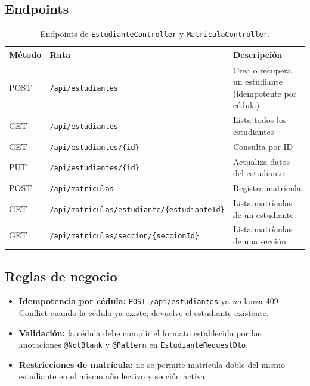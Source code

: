 \documentclass[11pt,a4paper,oneside]{article}
\newcommand{\code}[1]{\texttt{\small #1}}
\begin{document}
\subsection{Endpoints}

\begin{table}[h]
\centering\renewcommand{\arraystretch}{1.15}\small
\begin{tabular}{@{}p{1.4cm} p{6.0cm} p{6.5cm}@{}}
\toprule
\textbf{Método} & \textbf{Ruta} & \textbf{Descripción} \\
\midrule
POST & \code{/api/estudiantes}                                  & Crea o recupera un estudiante (idempotente por cédula) \\
GET  & \code{/api/estudiantes}                                  & Lista todos los estudiantes \\
GET  & \code{/api/estudiantes/\{id\}}                           & Consulta por ID \\
PUT  & \code{/api/estudiantes/\{id\}}                           & Actualiza datos del estudiante \\
\midrule
POST & \code{/api/matriculas}                                   & Registra matrícula \\
GET  & \code{/api/matriculas/estudiante/\{estudianteId\}}       & Lista matrículas de un estudiante \\
GET  & \code{/api/matriculas/seccion/\{seccionId\}}             & Lista matrículas de una sección \\
\bottomrule
\end{tabular}
\caption{Endpoints de \code{EstudianteController} y \code{MatriculaController}.}
\end{table}

\subsection{Reglas de negocio}

\begin{ataraInfo}
\begin{itemize}[leftmargin=*]
  \item \textbf{Idempotencia por cédula:} \code{POST /api/estudiantes} ya \emph{no} lanza
        409 Conflict cuando la cédula ya existe; devuelve el estudiante existente.
  \item \textbf{Validación:} la cédula debe cumplir el formato establecido por las
        anotaciones \code{@NotBlank} y \code{@Pattern} en
        \code{EstudianteRequestDto}.
  \item \textbf{Restricciones de matrícula:} no se permite matrícula doble del mismo
        estudiante en el mismo año lectivo y sección activa.
\end{itemize}
\end{ataraInfo}
\end{document}
